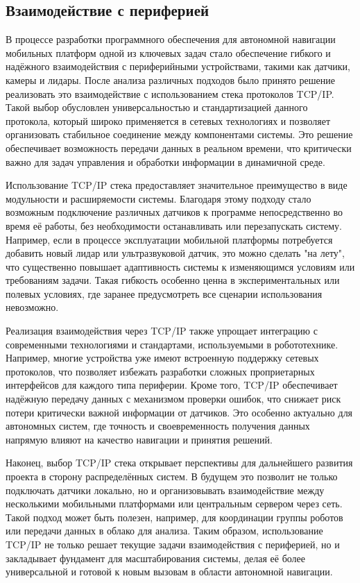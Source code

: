 \subsection{Взаимодействие с периферией}
В процессе разработки программного обеспечения для автономной навигации
мобильных платформ одной из ключевых задач стало обеспечение гибкого и надёжного
взаимодействия с периферийными устройствами, такими как датчики, камеры и
лидары. После анализа различных подходов было принято решение реализовать это
взаимодействие с использованием стека протоколов TCP/IP. Такой выбор обусловлен
универсальностью и стандартизацией данного протокола, который широко применяется
в сетевых технологиях и позволяет организовать стабильное соединение между
компонентами системы. Это решение обеспечивает возможность передачи данных в
реальном времени, что критически важно для задач управления и обработки
информации в динамичной среде.

Использование TCP/IP стека предоставляет значительное преимущество в виде
модульности и расширяемости системы. Благодаря этому подходу стало возможным
подключение различных датчиков к программе непосредственно во время её работы,
без необходимости останавливать или перезапускать систему. Например, если в
процессе эксплуатации мобильной платформы потребуется добавить новый лидар или
ультразвуковой датчик, это можно сделать "на лету", что существенно повышает
адаптивность системы к изменяющимся условиям или требованиям задачи. Такая
гибкость особенно ценна в экспериментальных или полевых условиях, где заранее
предусмотреть все сценарии использования невозможно.

Реализация взаимодействия через TCP/IP также упрощает интеграцию с современными
технологиями и стандартами, используемыми в робототехнике. Например, многие
устройства уже имеют встроенную поддержку сетевых протоколов, что позволяет
избежать разработки сложных проприетарных интерфейсов для каждого типа
периферии. Кроме того, TCP/IP обеспечивает надёжную передачу данных с механизмом
проверки ошибок, что снижает риск потери критически важной информации от
датчиков. Это особенно актуально для автономных систем, где точность и
своевременность получения данных напрямую влияют на качество навигации и
принятия решений.

Наконец, выбор TCP/IP стека открывает перспективы для дальнейшего развития
проекта в сторону распределённых систем. В будущем это позволит не только
подключать датчики локально, но и организовывать взаимодействие между
несколькими мобильными платформами или центральным сервером через сеть. Такой
подход может быть полезен, например, для координации группы роботов или передачи
данных в облако для анализа. Таким образом, использование TCP/IP не только
решает текущие задачи взаимодействия с периферией, но и закладывает фундамент
для масштабирования системы, делая её более универсальной и готовой к новым
вызовам в области автономной навигации.


